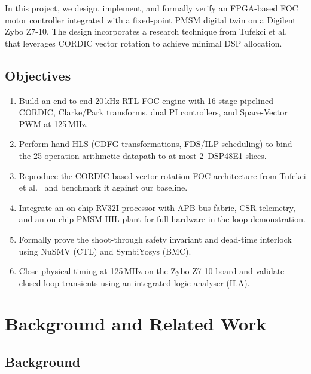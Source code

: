 \documentclass[11pt,a4paper]{article}
\begin{document}
In this project, we design, implement, and formally verify an FPGA-based FOC motor controller integrated with a fixed-point PMSM digital twin on a Digilent Zybo Z7-10. The design incorporates a research technique from Tufekci et al.~\cite{tufekci2020} that leverages CORDIC vector rotation to achieve minimal DSP allocation.

\subsection{Objectives}
\begin{enumerate}
  \item Build an end-to-end 20\,kHz RTL FOC engine with 16-stage pipelined CORDIC, Clarke/Park transforms, dual PI controllers, and Space-Vector PWM at 125\,MHz.
  \item Perform hand HLS (CDFG transformations, FDS/ILP scheduling) to bind the 25-operation arithmetic datapath to at most 2~DSP48E1 slices.
  \item Reproduce the CORDIC-based vector-rotation FOC architecture from Tufekci et al.~\cite{tufekci2020} and benchmark it against our baseline.
  \item Integrate an on-chip RV32I processor with APB bus fabric, CSR telemetry, and an on-chip PMSM HIL plant for full hardware-in-the-loop demonstration.
  \item Formally prove the shoot-through safety invariant and dead-time interlock using NuSMV (CTL) and SymbiYosys (BMC).
  \item Close physical timing at 125\,MHz on the Zybo Z7-10 board and validate closed-loop transients using an integrated logic analyser (ILA).
\end{enumerate}

\section{Background and Related Work}
\label{sec:related}

\subsection{Background}
\end{document}
